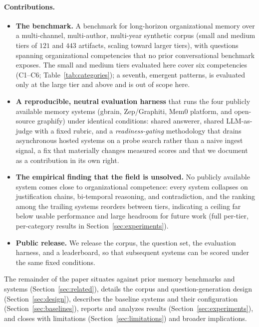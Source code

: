 \paragraph{Contributions.}
\begin{itemize}
  \item \textbf{The \bench{} benchmark.} A benchmark for long-horizon organizational
        memory over a multi-channel, multi-author, multi-year synthetic corpus
        (small and medium tiers of $121$ and $443$ artifacts, scaling toward larger
        tiers), with questions spanning organizational competencies that no
        prior conversational benchmark exposes. The small and medium tiers evaluated
        here cover six competencies (C1--C6; Table~\ref{tab:categories}); a seventh,
        emergent patterns, is evaluated only at the large tier and above and is out
        of scope here.
  \item \textbf{A reproducible, neutral evaluation harness} that runs the four
        publicly available memory systems (gbrain, Zep/Graphiti, Mem0 platform, and
        open-source graphify) under identical conditions: shared answerer, shared
        LLM-as-judge with a fixed rubric, and a \emph{readiness-gating} methodology
        that drains asynchronous hosted systems on a probe search rather than a naive
        ingest signal, a fix that materially changes measured scores and that we
        document as a contribution in its own right.
  \item \textbf{The empirical finding that the field is unsolved.} No publicly
        available system comes close to organizational competence: every system
        collapses on justification chains, bi-temporal reasoning, and contradiction,
        and the ranking among the trailing systems reorders between tiers, indicating
        a ceiling far below usable performance and large headroom for future work
        (full per-tier, per-category results in Section~\ref{sec:experiments}).
  \item \textbf{Public release.} We release the corpus, the question set, the
        evaluation harness, and a leaderboard, so that subsequent systems can be
        scored under the same fixed conditions.
\end{itemize}

The remainder of the paper situates \bench{} against prior memory benchmarks and
systems (Section~\ref{sec:related}), details the corpus and question-generation
design (Section~\ref{sec:design}), describes the baseline systems and their
configuration (Section~\ref{sec:baselines}), reports and analyzes results
(Section~\ref{sec:experiments}), and closes with limitations
(Section~\ref{sec:limitations}) and broader implications.

